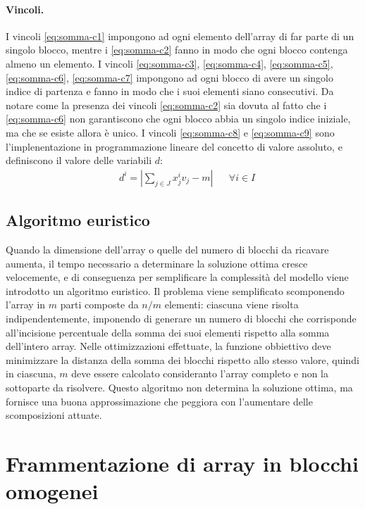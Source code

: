 \paragraph{Vincoli.} I vincoli \ref{eq:somma-c1} impongono ad ogni elemento dell'array di far parte di un singolo blocco, mentre i \ref{eq:somma-c2} fanno in modo che ogni blocco contenga almeno un elemento. I vincoli \ref{eq:somma-c3}, \ref{eq:somma-c4}, \ref{eq:somma-c5}, \ref{eq:somma-c6}, \ref{eq:somma-c7} impongono ad ogni blocco di avere un singolo indice di partenza e fanno in modo che i suoi elementi siano consecutivi. Da notare come la presenza dei vincoli \ref{eq:somma-c2} sia dovuta al fatto che i \ref{eq:somma-c6} non garantiscono che ogni blocco abbia un singolo indice iniziale, ma che se esiste allora è unico. I vincoli \ref{eq:somma-c8} e \ref{eq:somma-c9} sono l'implenentazione in programmazione lineare del concetto di valore assoluto, e definiscono il valore delle variabili $d$:
\begin{align}
    &d^i = \left| \sum_{j \in J}x^i_jv_j - m \right| && \forall i \in I
\end{align}

\subsection{Algoritmo euristico}

Quando la dimensione dell'array o quelle del numero di blocchi da ricavare aumenta, il tempo necessario a determinare la soluzione ottima cresce velocemente, e di conseguenza per semplificare la complessità del modello viene introdotto un algoritmo euristico. Il problema viene semplificato scomponendo l'array in $m$ parti composte da $n/m$ elementi: ciascuna viene risolta indipendentemente, imponendo di generare un numero di blocchi che corrisponde all'incisione percentuale della somma dei suoi elementi rispetto alla somma dell'intero array. Nelle ottimizzazioni effettuate, la funzione obbiettivo deve minimizzare la distanza della somma dei blocchi rispetto allo stesso valore, quindi in ciascuna, $m$ deve essere calcolato consideranto l'array completo e non la sottoparte da risolvere. Questo algoritmo non determina la soluzione ottima, ma fornisce una buona approssimazione che peggiora con l'aumentare delle scomposizioni attuate.


\section{Frammentazione di array in blocchi omogenei}
\label{sec:framm-omogenei}

